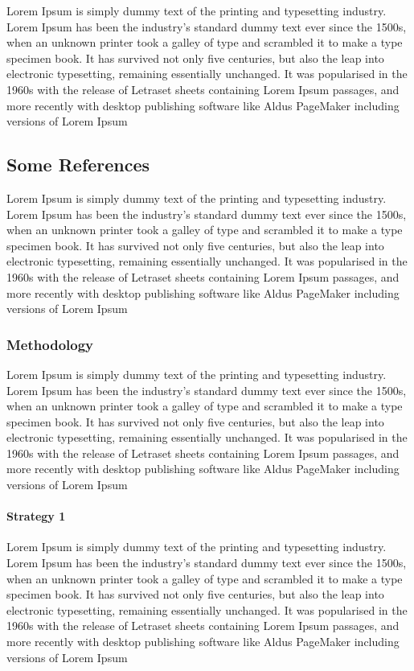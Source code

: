 Lorem Ipsum is simply dummy text of the printing and typesetting industry. Lorem Ipsum has been the industry's standard dummy text ever since the 1500s, when an unknown printer took a galley of type and scrambled it to make a type specimen book. It has survived not only five centuries, but also the leap into electronic typesetting, remaining essentially unchanged. It was popularised in the 1960s with the release of Letraset sheets containing Lorem Ipsum passages, and more recently with desktop publishing software like Aldus PageMaker including versions of Lorem Ipsum
\subsection{Some References}
\label{sec:intro:results:refs}

Lorem Ipsum is simply dummy text of the printing and typesetting industry. Lorem Ipsum has been the industry's standard dummy text ever since the 1500s, when an unknown printer took a galley of type and scrambled it to make a type specimen book. It has survived not only five centuries, but also the leap into electronic typesetting, remaining essentially unchanged. It was popularised in the 1960s with the release of Letraset sheets containing Lorem Ipsum passages, and more recently with desktop publishing software like Aldus PageMaker including versions of Lorem Ipsum

\subsubsection{Methodology}
\label{sec:intro:results:refs:method}

Lorem Ipsum is simply dummy text of the printing and typesetting industry. Lorem Ipsum has been the industry's standard dummy text ever since the 1500s, when an unknown printer took a galley of type and scrambled it to make a type specimen book. It has survived not only five centuries, but also the leap into electronic typesetting, remaining essentially unchanged. It was popularised in the 1960s with the release of Letraset sheets containing Lorem Ipsum passages, and more recently with desktop publishing software like Aldus PageMaker including versions of Lorem Ipsum

\paragraph{Strategy 1}
Lorem Ipsum is simply dummy text of the printing and typesetting industry. Lorem Ipsum has been the industry's standard dummy text ever since the 1500s, when an unknown printer took a galley of type and scrambled it to make a type specimen book. It has survived not only five centuries, but also the leap into electronic typesetting, remaining essentially unchanged. It was popularised in the 1960s with the release of Letraset sheets containing Lorem Ipsum passages, and more recently with desktop publishing software like Aldus PageMaker including versions of Lorem Ipsum

